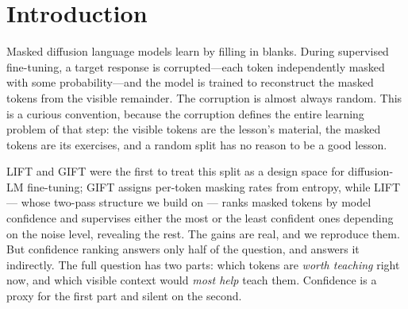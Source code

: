 \documentclass{article} %
\begin{document}
\begin{abstract}
third generation completes the arc from measurement to principle: the method's remaining adaptive choices become Lagrange multipliers enforcing constraints on measured quantities --- the reveal budget as a thermostat holding supervised-token difficulty at the measured learnability peak (unique-equilibrium guarantee; the lowest seed variance we observe, $\pm 0.2$), and stopping rules priced by the objective's own marginals (the best in-domain configuration reveals just 7\% of candidates). Re-measuring both curves on Dream-7B finds the learnability peak unchanged across architectures, and transfer experiments split cleanly along the new axis: constraint-based adaptivity travels, marginal-priced adaptivity does not.
\end{abstract}

\section{Introduction}

Masked diffusion language models learn by filling in blanks. During supervised fine-tuning, a target response is corrupted---each token independently masked with some probability---and the model is trained to reconstruct the masked tokens from the visible remainder. The corruption is almost always random. This is a curious convention, because the corruption defines the entire learning problem of that step: the visible tokens are the lesson's material, the masked tokens are its exercises, and a random split has no reason to be a good lesson.

LIFT \citep{lift2026} and GIFT \citep{gift2025} were the first to treat this split as a design space for diffusion-LM fine-tuning; GIFT assigns per-token masking rates from entropy, while LIFT --- whose two-pass structure we build on --- ranks masked tokens by model confidence and supervises either the most or the least confident ones depending on the noise level, revealing the rest. The gains are real, and we reproduce them. But confidence ranking answers only half of the question, and answers it indirectly. The full question has two parts: which tokens are \emph{worth teaching} right now, and which visible context would \emph{most help} teach them. Confidence is a proxy for the first part and silent on the second.
\end{document}
